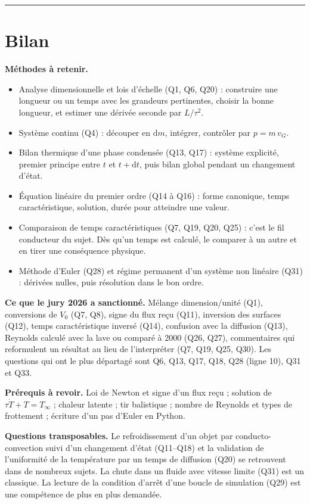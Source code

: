 \documentclass[11pt,a4paper]{article}
\providecommand{\tightlist}{\setlength{\itemsep}{0pt}\setlength{\parskip}{0pt}}
\begin{document}
\begin{center}\rule{0.5\linewidth}{0.5pt}\end{center}

\hypertarget{bilan}{%
\section{Bilan}\label{bilan}}

\textbf{Méthodes à retenir.}

\begin{itemize}
\tightlist
\item
  Analyse dimensionnelle et lois d'échelle (Q1, Q6, Q20) : construire une longueur ou un temps avec les grandeurs pertinentes, choisir la bonne longueur, et estimer une dérivée seconde par \(L/\tau^2\).
\item
  Système continu (Q4) : découper en \(\mathrm{d}m\), intégrer, contrôler par \(p = m\,v_G\).
\item
  Bilan thermique d'une phase condensée (Q13, Q17) : système explicité, premier principe entre \(t\) et \(t+\mathrm{d}t\), puis bilan global pendant un changement d'état.
\item
  Équation linéaire du premier ordre (Q14 à Q16) : forme canonique, temps caractéristique, solution, durée pour atteindre une valeur.
\item
  Comparaison de temps caractéristiques (Q7, Q19, Q20, Q25) : c'est le fil conducteur du sujet. Dès qu'un temps est calculé, le comparer à un autre et en tirer une conséquence physique.
\item
  Méthode d'Euler (Q28) et régime permanent d'un système non linéaire (Q31) : dérivées nulles, puis résolution dans le bon ordre.
\end{itemize}

\textbf{Ce que le jury 2026 a sanctionné.} Mélange dimension/unité (Q1), conversions de \(V_0\) (Q7, Q8), signe du flux reçu (Q11), inversion des surfaces (Q12), temps caractéristique inversé (Q14), confusion avec la diffusion (Q13), Reynolds calculé avec la lave ou comparé à 2000 (Q26, Q27), commentaires qui reformulent un résultat au lieu de l'interpréter (Q7, Q19, Q25, Q30). Les questions qui ont le plus départagé sont Q6, Q13, Q17, Q18, Q28 (ligne 10), Q31 et Q33.

\textbf{Prérequis à revoir.} Loi de Newton et signe d'un flux reçu ; solution de \(\tau\dot T + T = T_\infty\) ; chaleur latente ; tir balistique ; nombre de Reynolds et types de frottement ; écriture d'un pas d'Euler en Python.

\textbf{Questions transposables.} Le refroidissement d'un objet par conducto-convection suivi d'un changement d'état (Q11--Q18) et la validation de l'uniformité de la température par un temps de diffusion (Q20) se retrouvent dans de nombreux sujets. La chute dans un fluide avec vitesse limite (Q31) est un classique. La lecture de la condition d'arrêt d'une boucle de simulation (Q29) est une compétence de plus en plus demandée.
\end{document}
